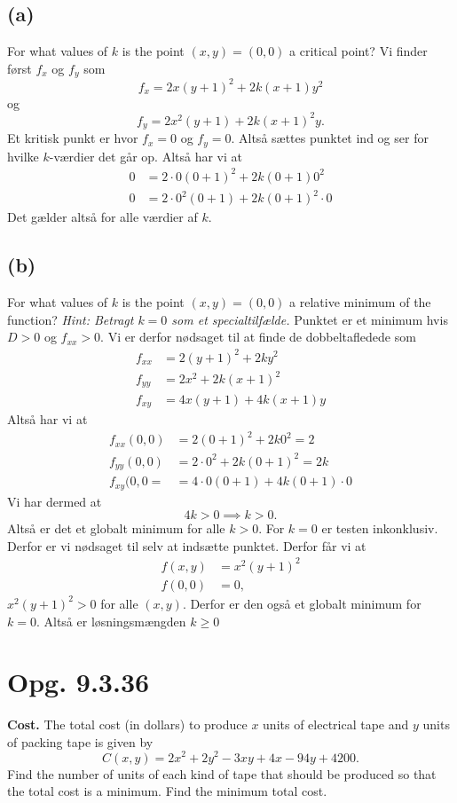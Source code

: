 \documentclass[12pt]{article}
\theoremstyle{definition}
\begin{document}
\subsection*{(a)}
For what values of $k$ is the point $(x,y) = (0,0)$ a critical point?
\bigbreak
Vi finder først $f_x$ og $f_y$ som
\[ 
f_x = 2x(y+1)^2 + 2k(x+1)y^2
\]
og
\[ 
f_y = 2x^2(y+1) + 2k(x+1)^2y
.\]
Et kritisk punkt er hvor $f_x = 0$ og $f_y = 0$. Altså sættes punktet ind og ser for hvilke $k$-værdier det går op. Altså har vi at
\begin{align*}
  0 &= 2\cdot0(0+1)^2 + 2k(0+1)0^2 \\
  0 &= 2\cdot0^2(0+1) + 2k(0+1)^2\cdot0
\end{align*}
Det gælder altså for alle værdier af $k$.


\subsection*{(b)}
For what values of $k$ is the point $(x,y) = (0,0)$ a relative minimum of the function?
\textit{Hint: Betragt $k=0$ som et specialtilfælde.}
\bigbreak
Punktet er et minimum hvis $D > 0$ og $f_{x x} > 0$. Vi er derfor nødsaget til at finde de dobbeltafledede som
\begin{align*}
  f_{x x} &= 2(y+1)^2+2ky^2 \\
  f_{yy} &= 2x^2 + 2k(x+1)^2 \\
  f_{xy} &= 4x(y+1) + 4k(x+1)y
\end{align*}
Altså har vi at
\begin{align*}
  f_{x x}(0,0) &= 2(0+1)^2 + 2k0^2 = 2 \\
  f_{yy}(0,0) &= 2\cdot 0^2 + 2k(0+1)^2 = 2k \\
  f_{xy}(0,0= &= 4\cdot0(0+1) + 4k(0+1)\cdot0
\end{align*}
Vi har dermed at
\[ 
4k > 0 \implies k > 0
.\]
Altså er det et globalt minimum for alle $k>0$. For $k=0$ er testen inkonklusiv. Derfor er vi nødsaget til selv at indsætte punktet. Derfor får vi at
\begin{align*}
  f(x,y) &= x^2(y+1)^2 \\
  f(0,0) &= 0
,\end{align*}
$x^2(y+1)^2 > 0$ for alle $(x,y)$. Derfor er den også et globalt minimum for $k = 0$. Altså er løsningsmængden $k \geq 0$


\section*{Opg. 9.3.36}
\textbf{Cost.} The total cost (in dollars) to produce $x$ units of electrical tape and $y$ units of packing tape is given by
\[ 
C(x,y) = 2x^2 + 2y^2 -3xy + 4x -94 y + 4200
.\]
Find the number of units of each kind of tape that should be produced so that the total cost is a minimum. Find the minimum total cost.
\end{document}
